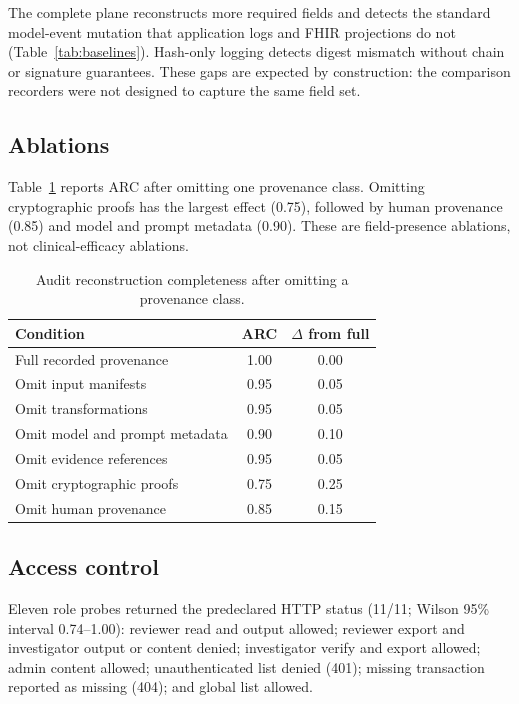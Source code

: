 \documentclass[preprint,review,12pt]{elsarticle}
\begin{document}
The complete plane reconstructs more required fields and detects the standard
model-event mutation that application logs and FHIR projections do not
(Table~\ref{tab:baselines}). Hash-only logging detects digest mismatch without
chain or signature guarantees. These gaps are expected by construction: the
comparison recorders were not designed to capture the same field set.

\subsection{Ablations}

Table~\ref{tab:ablation} reports ARC after omitting one provenance class.
Omitting cryptographic proofs has the largest effect (0.75), followed by
human provenance (0.85) and model and prompt metadata (0.90). These are
field-presence ablations, not clinical-efficacy ablations.

\begin{table}[t]
\centering
\caption{Audit reconstruction completeness after omitting a provenance class.}
\label{tab:ablation}
\begin{tabular}{lcc}
\toprule
Condition & ARC & $\Delta$ from full \\
\midrule
Full recorded provenance & 1.00 & 0.00 \\
Omit input manifests & 0.95 & 0.05 \\
Omit transformations & 0.95 & 0.05 \\
Omit model and prompt metadata & 0.90 & 0.10 \\
Omit evidence references & 0.95 & 0.05 \\
Omit cryptographic proofs & 0.75 & 0.25 \\
Omit human provenance & 0.85 & 0.15 \\
\bottomrule
\end{tabular}
\end{table}

\subsection{Access control}

Eleven role probes returned the predeclared HTTP status (11/11; Wilson 95\%
interval 0.74--1.00): reviewer read and output allowed; reviewer export and
investigator output or content denied; investigator verify and export
allowed; admin content allowed; unauthenticated list denied (401); missing
transaction reported as missing (404); and global list allowed.
\end{document}
